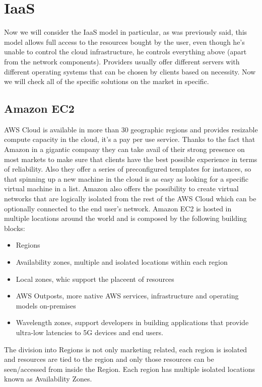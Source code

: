 \section{IaaS}
Now we will consider the IaaS model in particular, as was previously said, this model allows full access to the resources bought by the user, even though he's unable to control the cloud infrastructure, he controls everything above (apart from the network components). \n
Providers usually offer different servers with different operating systems that can be chosen by clients based on necessity. \n
Now we will check all of the specific solutions on the market in specific.
\subsection{Amazon EC2}
AWS Cloud is available in more than 30 geographic regions and provides resizable compute capacity in the cloud, it's a pay per use service. \n
Thanks to the fact that Amazon in a gigantic company they can take avail of their strong presence on most markets to make sure that clients have the best possible experience in terms of reliability. \n
Also they offer a series of preconfigured templates for instances, so that spinning up a new machine in the cloud is as easy as looking for a specific virtual machine in a list. Amazon also offers the possibility to create virtual networks that are logically isolated from the rest of the AWS Cloud which can be optionally connected to the end user's network. \n
Amazon EC2 is hosted in multiple locations around the world and is composed by the following building blocks:
\begin{itemize}
    \item Regions
    \item Availability zones, multiple and isolated locations within each region
    \item Local zones, whic support the placeent of resources
    \item AWS Outposts, more native AWS services, infrastructure and operating models on-premises
    \item Wavelength zones, support developers in building applications that provide ultra-low latencies to 5G devices and end users.
\end{itemize}
The division into Regions is not only marketing related, each region is isolated and resources are tied to the region and only those resources can be seen/accessed from inside the Region. Each region has multiple isolated locations known as Availability Zones. \n
